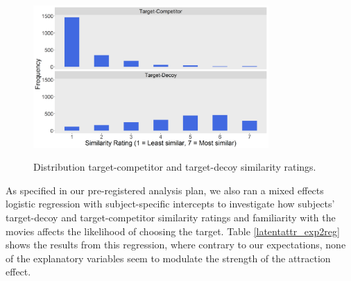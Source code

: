 \documentclass[12pt, a4paper]{article}
\begin{document}
\begin{figure}[htb!]
\centering
\captionsetup{justification=centering}
\caption{Distribution target-competitor and target-decoy similarity ratings.}
\includegraphics[width=0.8\textwidth]{exp2_similarityratings.png}
\label{fig:exp2_similarityratings}
\end{figure}

As specified in our pre-registered analysis plan, we also ran a mixed effects logistic regression with subject-specific intercepts to investigate how subjects' target-decoy and target-competitor similarity ratings and familiarity with the movies affects the likelihood of choosing the target. Table \ref{latentattr_exp2reg} shows the results from this regression, where contrary to our expectations, none of the explanatory variables seem to modulate the strength of the attraction effect.
\end{document}
